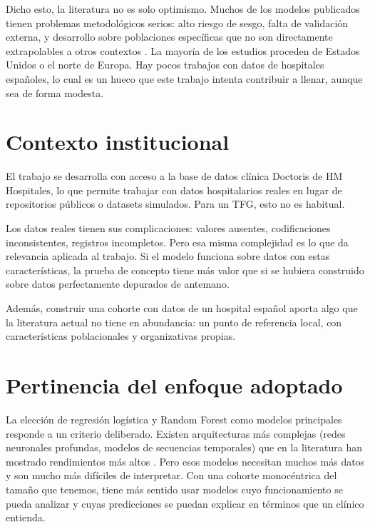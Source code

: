 \documentclass[12pt, a4paper, oneside]{report}
\begin{document}
Dicho esto, la literatura no es solo optimismo. Muchos de los modelos publicados tienen problemas metodológicos serios: alto riesgo de sesgo, falta de validación externa, y desarrollo sobre poblaciones específicas que no son directamente extrapolables a otros contextos \parencite{shi2025aiaki}. La mayoría de los estudios proceden de Estados Unidos o el norte de Europa. Hay pocos trabajos con datos de hospitales españoles, lo cual es un hueco que este trabajo intenta contribuir a llenar, aunque sea de forma modesta.

\section{Contexto institucional}
\label{sec:institucional}

El trabajo se desarrolla con acceso a la base de datos clínica Doctoris de HM Hospitales, lo que permite trabajar con datos hospitalarios reales en lugar de repositorios públicos o datasets simulados. Para un TFG, esto no es habitual.

Los datos reales tienen sus complicaciones: valores ausentes, codificaciones inconsistentes, registros incompletos. Pero esa misma complejidad es lo que da relevancia aplicada al trabajo. Si el modelo funciona sobre datos con estas características, la prueba de concepto tiene más valor que si se hubiera construido sobre datos perfectamente depurados de antemano.

Además, construir una cohorte con datos de un hospital español aporta algo que la literatura actual no tiene en abundancia: un punto de referencia local, con características poblacionales y organizativas propias.

\section{Pertinencia del enfoque adoptado}
\label{sec:enfoque}

La elección de regresión logística y Random Forest como modelos principales responde a un criterio deliberado. Existen arquitecturas más complejas (redes neuronales profundas, modelos de secuencias temporales) que en la literatura han mostrado rendimientos más altos \parencite{tomasev2019nature}. Pero esos modelos necesitan muchos más datos y son mucho más difíciles de interpretar. Con una cohorte monocéntrica del tamaño que tenemos, tiene más sentido usar modelos cuyo funcionamiento se pueda analizar y cuyas predicciones se puedan explicar en términos que un clínico entienda.
\end{document}
